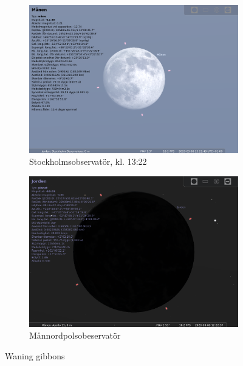 \documentclass[./exercises.tex]{subfiles}
\begin{document}
\begin{itemize}
\begin{figure}[H]
     \hfill
     \begin{subfigure}[b]{0.45\textwidth}
         \centering
         \includegraphics[width=\textwidth]{Stellarium1/WaningGibbons/stellarium-008.png}
         \caption{Stockholmsobservatör, kl. 13:22}
         \label{fig:three sin x}
     \end{subfigure}
     \hfill
     \begin{subfigure}[b]{0.45\textwidth}
         \centering
         \includegraphics[width=\textwidth]{Stellarium1/WaningGibbons/stellarium-009.png}
         \caption{Månnordpolsobeservatör}
         \label{fig:three sin x}
     \end{subfigure}
     \hfill
        \caption{ Waning gibbons}
        \label{fig:perod graphs}
\end{figure}

\end{itemize}
\end{document}
